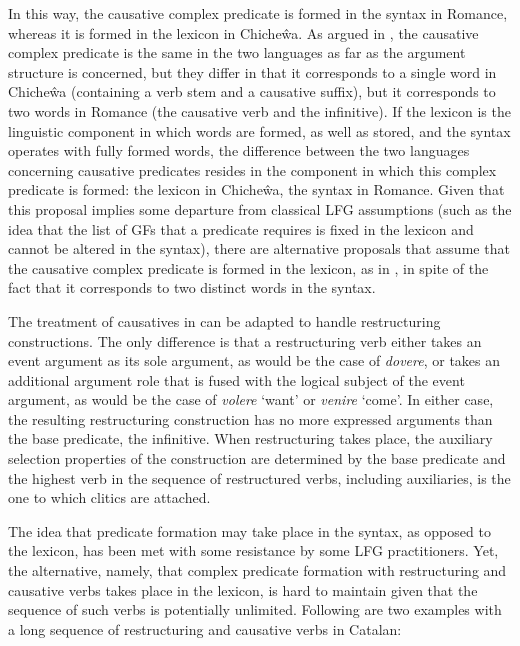 \documentclass[output=paper,hidelinks]{langscibook}
\begin{document}
In this way, the causative complex predicate is formed in the syntax in Romance, whereas it is formed in the lexicon in Chiche\^wa. As argued in \citet{Alsina1997}, the causative complex predicate is the same in the two languages as far as the argument structure is concerned, but they differ in that it corresponds to a single word in Chiche\^wa (containing a verb stem and a causative suffix), but it corresponds to two words in Romance (the causative verb and the infinitive). If the lexicon is the linguistic component in which words are formed, as well as stored, and the syntax operates with fully formed words, the difference between the two languages concerning causative predicates resides in the component in which this complex predicate is formed: the lexicon in Chiche\^wa, the syntax in Romance. Given that this proposal implies some departure from classical LFG assumptions (such as the idea that the list of GFs that a predicate requires is fixed in the lexicon and cannot be altered in the syntax), there are alternative proposals that assume that the causative complex predicate is formed in the lexicon, as in \citet{Frank:96}, in spite of the fact that it corresponds to two distinct words in the syntax.

The treatment of causatives in \citet{alsina1996the-role} can be adapted to handle restructuring constructions. The only difference is that a restructuring verb either takes an event argument as its sole argument, as would be the case of \textit{dovere}, or takes an additional argument role that is fused with the logical subject of the event argument, as would be the case of \textit{volere} `want' or \textit{venire} `come'. In either case, the resulting restructuring construction has no more expressed arguments than the base predicate, the infinitive. When restructuring takes place, the auxiliary selection properties of the construction are determined by the base predicate and the highest verb in the sequence of restructured verbs, including auxiliaries, is the one to which clitics are attached.

The idea that predicate formation may take place in the syntax, as opposed to the lexicon, has been met with some resistance by some LFG practitioners. Yet, the alternative, namely, that complex predicate formation with restructuring and causative verbs takes place in the lexicon, is hard to maintain given that the sequence of such verbs is potentially unlimited. Following are two examples with a long sequence of restructuring and causative verbs in Catalan:
\end{document}
